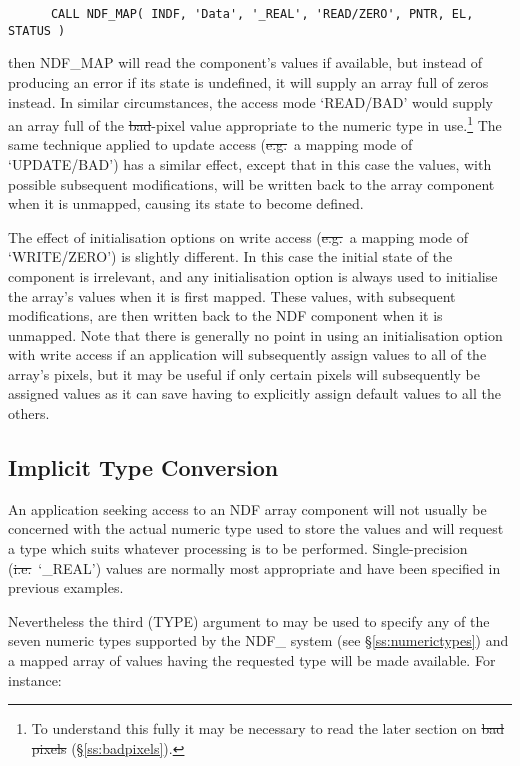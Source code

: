 \small
\begin{verbatim}
      CALL NDF_MAP( INDF, 'Data', '_REAL', 'READ/ZERO', PNTR, EL, STATUS )
\end{verbatim}
\normalsize

then NDF\_MAP will read the component's values if available, but instead of
producing an error if its state is undefined, it will supply an array full
of zeros instead. 
In similar circumstances, the access mode `READ/BAD' would supply an array
full of the \st{bad\/}-pixel value appropriate to the numeric type in
use.\footnote{To understand this fully it may be necessary to read the later
section on \st{bad pixels\/} (\S\ref{ss:badpixels}).} 
The same technique applied to update access (\st{e.g.}\ a mapping mode of
`UPDATE/BAD') has a similar effect, except that in this case the values, with
possible subsequent modifications, will be written back to the array component
when it is unmapped, causing its state to become defined. 

The effect of initialisation options on write access (\st{e.g.}\ a mapping
mode of `WRITE/ZERO') is slightly different. 
In this case the initial state of the component is irrelevant, and any
initialisation option is always used to initialise the array's values when
it is first mapped. 
These values, with subsequent modifications, are then written back to the
NDF component when it is unmapped. 
Note that there is generally no point in using an initialisation option with
write access if an application will subsequently assign values to all of
the array's pixels, but it may be useful if only certain pixels will
subsequently be assigned values as it can save having to explicitly assign
default values to all the others. 

\subsection{\label{ss:implicitconversion}Implicit Type Conversion}

An application seeking access to an NDF array component will not usually be
concerned with the actual numeric type used to store the values and will
request a type which suits whatever processing is to be performed. 
Single-precision (\st{i.e.}\ `\_REAL') values are normally most appropriate and
have  been specified in previous examples.

Nevertheless the third (TYPE) argument to  may be used to specify any
of the seven numeric types supported by the NDF\_ system (see
\S\ref{ss:numerictypes}) and a mapped array of values having the requested
type will be made available. 
For instance:

